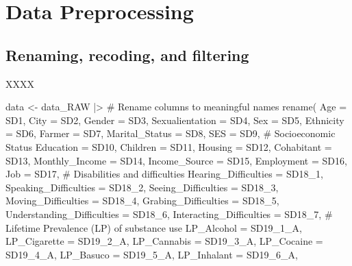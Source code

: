 \documentclass[
  bookmarksnumbered]{article}
\newenvironment{Shaded}{\begin{snugshade}}{\end{snugshade}}
\newcommand{\AttributeTok}[1]{\textcolor[rgb]{0.80,0.80,0.80}{#1}}
\newcommand{\CommentTok}[1]{\textcolor[rgb]{0.50,0.62,0.50}{#1}}
\newcommand{\FunctionTok}[1]{\textcolor[rgb]{0.94,0.94,0.56}{#1}}
\newcommand{\NormalTok}[1]{\textcolor[rgb]{0.80,0.80,0.80}{#1}}
\newcommand{\OtherTok}[1]{\textcolor[rgb]{0.94,0.94,0.56}{#1}}
\newcommand{\SpecialCharTok}[1]{\textcolor[rgb]{0.86,0.64,0.64}{#1}}
\begin{document}
\section{Data Preprocessing}\label{data-preprocessing}

\subsection{Renaming, recoding, and filtering}\label{renaming-recoding-and-filtering}

XXXX

\begin{Shaded}
\begin{Highlighting}[]
\NormalTok{data }\OtherTok{\textless{}{-}}\NormalTok{ data\_RAW }\SpecialCharTok{|\textgreater{}}
  \CommentTok{\# Rename columns to meaningful names}
  \FunctionTok{rename}\NormalTok{(}
    \AttributeTok{Age =}\NormalTok{ SD1,}
    \AttributeTok{City =}\NormalTok{ SD2,}
    \AttributeTok{Gender =}\NormalTok{ SD3,}
    \AttributeTok{Sexualientation =}\NormalTok{ SD4,}
    \AttributeTok{Sex =}\NormalTok{ SD5,}
    \AttributeTok{Ethnicity =}\NormalTok{ SD6,}
    \AttributeTok{Farmer =}\NormalTok{ SD7,}
    \AttributeTok{Marital\_Status =}\NormalTok{ SD8,}
    \AttributeTok{SES =}\NormalTok{ SD9, }\CommentTok{\# Socioeconomic Status}
    \AttributeTok{Education =}\NormalTok{ SD10,}
    \AttributeTok{Children =}\NormalTok{ SD11,}
    \AttributeTok{Housing =}\NormalTok{ SD12,}
    \AttributeTok{Cohabitant =}\NormalTok{ SD13,}
    \AttributeTok{Monthly\_Income =}\NormalTok{ SD14,}
    \AttributeTok{Income\_Source =}\NormalTok{ SD15,}
    \AttributeTok{Employment =}\NormalTok{ SD16,}
    \AttributeTok{Job =}\NormalTok{ SD17,}
    \CommentTok{\# Disabilities and difficulties}
    \AttributeTok{Hearing\_Difficulties =}\NormalTok{ SD18\_1,}
    \AttributeTok{Speaking\_Difficulties =}\NormalTok{ SD18\_2,}
    \AttributeTok{Seeing\_Difficulties =}\NormalTok{ SD18\_3,}
    \AttributeTok{Moving\_Difficulties =}\NormalTok{ SD18\_4,}
    \AttributeTok{Grabing\_Difficulties =}\NormalTok{ SD18\_5,}
    \AttributeTok{Understanding\_Difficulties =}\NormalTok{ SD18\_6,}
    \AttributeTok{Interacting\_Difficulties =}\NormalTok{ SD18\_7,}
    \CommentTok{\# Lifetime Prevalence (LP) of substance use}
    \AttributeTok{LP\_Alcohol =}\NormalTok{ SD19\_1\_A,}
    \AttributeTok{LP\_Cigarette =}\NormalTok{ SD19\_2\_A,}
    \AttributeTok{LP\_Cannabis =}\NormalTok{ SD19\_3\_A,}
    \AttributeTok{LP\_Cocaine =}\NormalTok{ SD19\_4\_A,}
    \AttributeTok{LP\_Basuco =}\NormalTok{ SD19\_5\_A,}
    \AttributeTok{LP\_Inhalant =}\NormalTok{ SD19\_6\_A,}

\end{Highlighting}
\end{Shaded}
\end{document}

